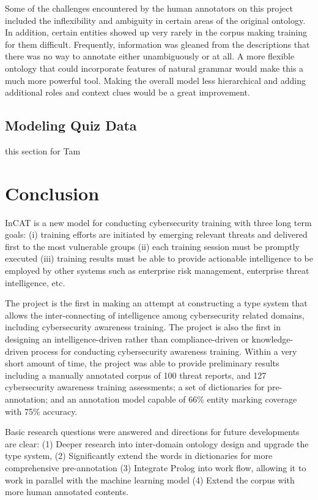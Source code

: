 \documentclass{article} %
\begin{document}
Some of the challenges encountered by the human annotators on this project included the inflexibility and ambiguity in certain areas of the original ontology.  In addition, certain entities showed up very rarely in the corpus making training for them difficult.  Frequently, information was gleaned from the descriptions that there was no way to annotate either unambiguously or at all.  A more flexible ontology that could incorporate features of natural grammar would make this a much more powerful tool.  Making the overall model less hierarchical and adding additional roles and context clues would be a great improvement.

\subsection{Modeling Quiz Data}
this section for Tam

\section{Conclusion}
InCAT is a new model for conducting cybersecurity training with three long term goals: (i) training efforts are initiated by emerging relevant threats and delivered first to the most vulnerable groups (ii) each training session must be promptly executed (iii) training results must be able to provide actionable intelligence to be employed by other systems such as enterprise risk management, enterprise threat intelligence, etc.

The project is the first in making an attempt at constructing a type system that allows the inter-connecting of intelligence among cybersecurity related domains, including cybersecurity awareness training. The project is also the first in designing an intelligence-driven rather than compliance-driven or knowledge-driven process for conducting cybersecurity awareness training. Within a very short amount of time, the project was able to provide preliminary results including a manually annotated corpus of 100 threat reports, and 127 cybersecurity awareness training assessments; a set of dictionaries for pre-annotation; and an annotation model capable of 66\% entity marking coverage with 75\% accuracy.

Basic research questions were answered and directions for future developments are clear: (1) Deeper research into inter-domain ontology design and upgrade the type system, (2) Significantly extend the words in dictionaries for more comprehensive pre-annotation (3) Integrate Prolog into work flow, allowing it to work in parallel with the machine learning model (4) Extend the corpus with more human annotated contents.



\end{document}
